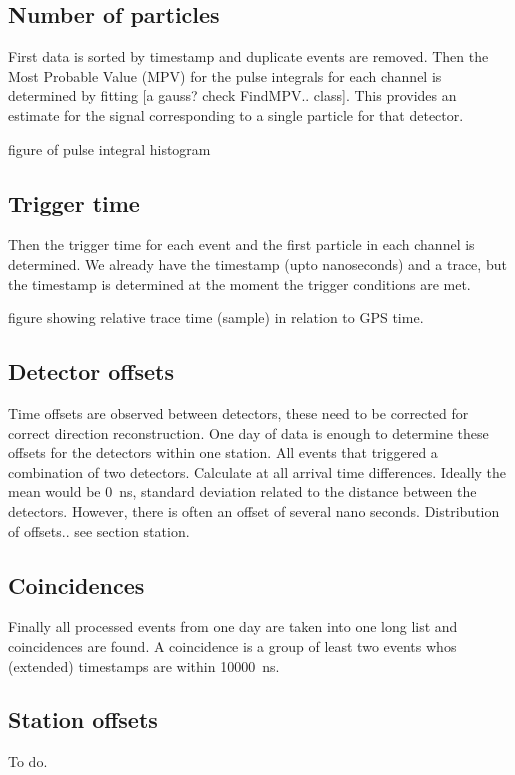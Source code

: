 \subsection{Number of particles}

First data is sorted by timestamp and duplicate events are removed. Then the Most Probable Value (MPV) for the pulse integrals for each channel is determined by fitting [a gauss? check FindMPV.. class]. This provides an estimate for the signal corresponding to a single particle for that detector.

figure of pulse integral histogram


\subsection{Trigger time}
\label{sec:trigger_time}

Then the trigger time for each event and the first particle in each channel is determined. We already have the \gps timestamp (upto nanoseconds) and a trace, but the timestamp is determined at the moment the trigger conditions are met.

figure showing  relative trace time (sample)  in relation to GPS time.


\subsection{Detector offsets}

Time offsets are observed between detectors, these need to be corrected for correct direction reconstruction. One day of data is enough to determine these offsets for the detectors within one station. All events that triggered a combination of two detectors. Calculate at all arrival time differences. Ideally the mean would be \SI{0}{\ns}, standard deviation related to the distance between the detectors. However, there is often an offset of several nano seconds. Distribution of offsets.. see section station.


\subsection{Coincidences}

Finally all processed events from one day are taken into one long list and coincidences are found. A coincidence is a group of least two events whos (extended) timestamps are within \SI{10000}{\ns}.


\subsection{Station offsets}

To do.

